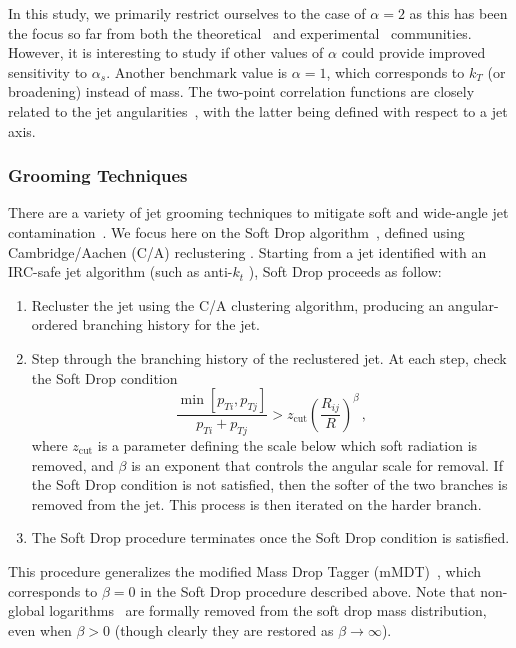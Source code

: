 \documentclass[11pt]{cernrep}
\begin{document}
In this study, we primarily restrict ourselves to the case of $\alpha=2$ as this has been the focus so far from both the theoretical~\cite{Frye:2016okc,Frye:2016aiz,Marzani:2017kqd,Marzani:2017mva} and experimental~\cite{Aaboud:2017qwh,CMS-PAS-SMP-16-010} communities.
%
However, it is interesting to study if other values of $\alpha$ could provide improved sensitivity to $\alpha_s$.
%
Another benchmark value is $\alpha=1$, which corresponds to $k_T$ (or broadening) instead of mass.
%
The two-point correlation functions are closely related to the jet angularities~\cite{Berger:2003iw,Almeida:2008yp,Ellis:2010rwa,Larkoski:2014pca}, with the latter being defined with respect to a jet axis.

\subsubsection{Grooming Techniques}\label{jetsub_alphas_sec:groom_tech}

There are a variety of jet grooming techniques to mitigate soft and wide-angle jet contamination~\cite{Butterworth:2008iy,Ellis:2009su,Ellis:2009me,Krohn:2009th,Dasgupta:2013ihk,Larkoski:2014wba}.
%
We focus here on the Soft Drop algorithm~\cite{Larkoski:2014wba}, defined using Cambridge/Aachen (C/A) reclustering \cite{Dokshitzer:1997in,Wobisch:1998wt,Wobisch:2000dk}.
%
Starting from a jet identified with an IRC-safe jet algorithm (such as anti-$k_t$ \cite{Cacciari:2008gp}), Soft Drop proceeds as follow:
%
\begin{enumerate}
%
\item Recluster the jet using the C/A clustering algorithm, producing an angular-ordered branching history for the jet.
%
\item Step through the branching history of the reclustered jet.  At each step, check the Soft Drop condition
%
\begin{equation}\label{jetsub_alphas_eq:sd_cut}
\frac{\min\left[ p_{Ti}, p_{Tj}  \right]}{p_{Ti}+p_{Tj}}> z_{\mathrm{cut}} \left(   \frac{R_{ij}}{R}\right)^\beta \,,
\end{equation}
%
where $z_{\mathrm{cut}} $ is a parameter defining the scale below which soft radiation is removed, and $\beta$ is an exponent that controls the angular scale for removal.
%
If the Soft Drop condition is not satisfied, then the softer of the two branches is removed from the jet.  This process is then iterated on the harder branch.
%
\item The Soft Drop procedure terminates once the Soft Drop condition is satisfied.
%
\end{enumerate}
%
This procedure generalizes the modified Mass Drop Tagger (mMDT)~\cite{Dasgupta:2013ihk}, which corresponds to $\beta=0$ in the Soft Drop procedure described above.
%
Note that non-global logarithms~\cite{Dasgupta:2001sh} are formally removed from the soft drop mass distribution, even when $\beta>0$ (though clearly they are restored as $\beta\rightarrow\infty$).
\end{document}
